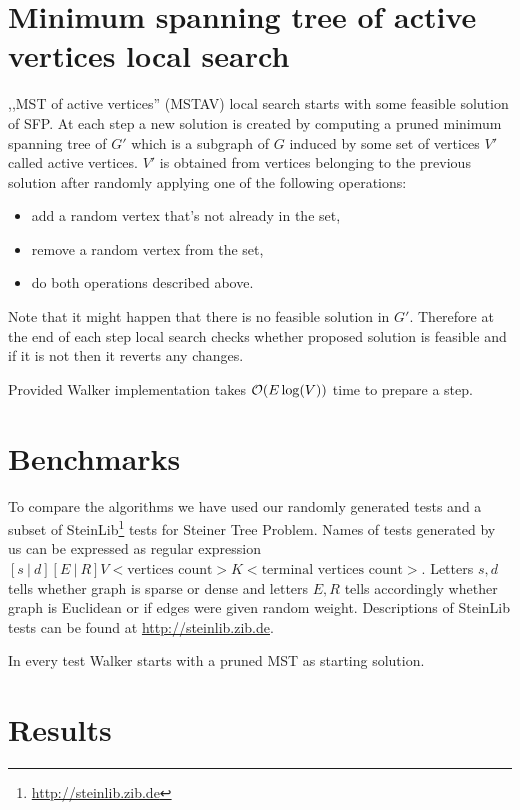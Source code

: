 \section{Minimum spanning tree of active vertices local search}
,,MST of active vertices'' (MSTAV) local search starts with some feasible solution of SFP. At each step a new solution is created by computing a pruned minimum spanning tree of $G'$ which is a subgraph of $G$ induced by some set of vertices $V'$ called active vertices. $V'$ is obtained from vertices belonging to the previous solution after randomly applying one of the following operations:
\begin{itemize}
\item add a random vertex that's not already in the set,
\item remove a random vertex from the set,
\item do both operations described above.
\end{itemize}

Note that it might happen that there is no feasible solution in $G'$. Therefore at the end of each step local search checks whether proposed solution is feasible and if it is not then it reverts any changes.

Provided Walker implementation takes $\mathcal{O}(E \log(V))$ time to prepare a step.

\section{Benchmarks}
To compare the algorithms we have used our randomly generated tests and a subset of SteinLib\footnote{\url{http://steinlib.zib.de}} tests for Steiner Tree Problem.
Names of tests generated by us can be expressed as regular expression $[s\ |\ d][E\ |\ R]V<\text{vertices count}>K<\text{terminal vertices count}>$. Letters $s, d$ tells whether graph is sparse or dense and letters $E, R$ tells accordingly whether graph is Euclidean or if edges were given random weight. Descriptions of SteinLib tests can be found at \url{http://steinlib.zib.de}.

In every test Walker starts with a pruned MST as starting solution.
\section{Results}

